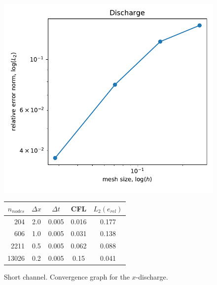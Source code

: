 \begin{figure}
\begin{minipage}{0.4\textwidth}
    \includegraphics[width=\textwidth]{img/eulerian/jump/momentum_convergence.pdf}
    \caption{Short channel. Convergence graph for the $x$-discharge.}
    \label{hydraulic_jump_convergence}
\end{minipage}
\hfill
\begin{minipage}{0.58\textwidth}
    \centering
    \begin{tabular}{>{\small}rcccc} \hline
    $n_{nodes}$ & $\Delta x$ & $\Delta t$ & CFL   & $L_2(e_{rel})$ \\ \hline
    204         &        2.0 &      0.005 & 0.016 & 0.177 \\
    606         &        1.0 &      0.005 & 0.031 & 0.138 \\
    2211        &        0.5 &      0.005 & 0.062 & 0.088 \\
    13026       &        0.2 &      0.005 & 0.15  & 0.041 \\ \hline
    \end{tabular}
    \label{hydraulic_jump_convergence_tab}
\end{minipage}
\end{figure}


